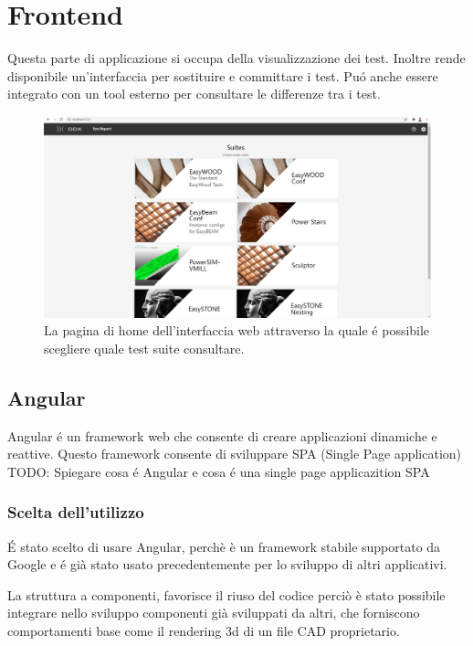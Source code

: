 \chapter{Frontend}
    Questa parte di applicazione si occupa della visualizzazione dei test.
    Inoltre rende disponibile un'interfaccia per sostituire e committare i test.
    Pu\'o anche essere integrato con un tool esterno per consultare le differenze tra i test.
    \begin{figure}
        \includegraphics{images/homepage.png}
        \caption{La pagina di home dell'interfaccia web attraverso la quale \'e possibile scegliere quale test suite consultare.}
    \end{figure}
    \section{Angular}
        Angular \'e un framework web che consente di creare applicazioni dinamiche e reattive.    
        Questo framework consente di sviluppare SPA (Single Page application)
        TODO: Spiegare cosa \'e Angular e cosa \'e una single page applicazition SPA
        \subsection{Scelta dell'utilizzo}
            \'E stato scelto di usare Angular, perchè è un framework stabile supportato da Google
            e \'e già stato usato precedentemente per lo sviluppo di altri applicativi.
            
            La struttura a componenti, favorisce il riuso del codice perciò è stato possibile integrare
            nello sviluppo componenti già sviluppati da altri, che forniscono comportamenti base
            come il rendering 3d di un file CAD proprietario.
        
